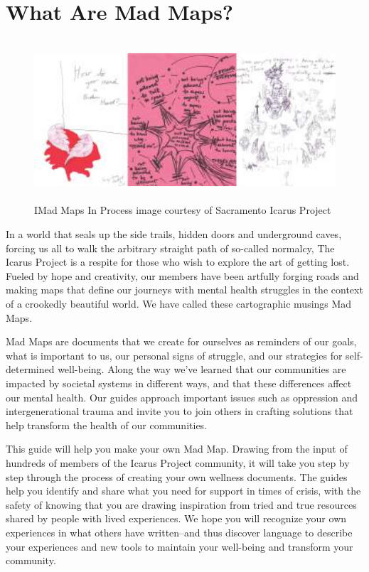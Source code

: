 \chapter*{What Are Mad Maps?}

\begin{figure}[h]
\centering
\includegraphics[height=6cm]{TeX_files/0-0.png}
\caption{IMad Maps In Process image courtesy of Sacramento Icarus Project}
\label{2-0}
\end{figure}


In  a  world  that  seals  up  the  side  trails,  hidden  doors  and  underground  caves, forcing  us  all  to  walk  the  arbitrary  straight  path  of  so-called  normalcy,  The Icarus Project is a respite for those who wish to explore the art of getting lost. Fueled  by  hope  and  creativity,  our  members  have  been  artfully  forging  roads and making maps that define our journeys with mental health struggles in the context of a crookedly beautiful world. We have called these cartographic musings Mad Maps.

Mad  Maps  are  documents  that  we  create  for  ourselves  as  reminders  of  our goals, what is important to us, our personal signs of struggle, and our strategies for self-determined well-being. Along  the  way  we’ve  learned  that  our  communities  are  impacted  by  societal systems in different ways, and that these differences affect our mental health. Our  guides  approach  important  issues  such  as  oppression  and  intergenerational trauma and invite you to join others in crafting solutions that help transform the health of our communities.

This  guide  will  help  you  make  your  own  Mad  Map.  Drawing  from  the  input  of hundreds  of  members  of  the  Icarus  Project  community,  it  will  take  you  step by  step  through  the  process  of  creating  your  own  wellness  documents.  The guides help you identify and share what you need for support in times of crisis, with the safety of knowing that you are drawing inspiration from tried and true resources shared by people with lived experiences. We hope you will recognize your own experiences in what others have written--and thus discover language to  describe  your  experiences  and  new  tools  to  maintain  your  well-being  and transform your community.

